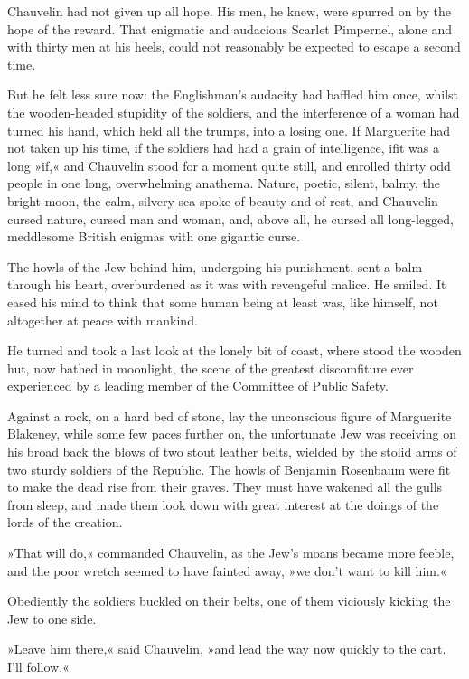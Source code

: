Chauvelin had not given up all hope. His men, he knew, were spurred on by the hope of the reward. That enigmatic and audacious Scarlet Pimpernel, alone and with thirty men at his heels, could not reasonably be expected to escape a second time.

But he felt less sure now: the Englishman's audacity had baffled him once, whilst the wooden-headed stupidity of the soldiers, and the interference of a woman had turned his hand, which held all the trumps, into a losing one. If Marguerite had not taken up his time, if the soldiers had had a grain of intelligence, if\textellipsis \allowbreak  it was a long »if,« and Chauvelin stood for a moment quite still, and enrolled thirty odd people in one long, overwhelming anathema. Nature, poetic, silent, balmy, the bright moon, the calm, silvery sea spoke of beauty and of rest, and Chauvelin cursed nature, cursed man and woman, and, above all, he cursed all long-legged, meddlesome British enigmas with one gigantic curse.

The howls of the Jew behind him, undergoing his punishment, sent a balm through his heart, overburdened as it was with revengeful malice. He smiled. It eased his mind to think that some human being at least was, like himself, not altogether at peace with mankind.

He turned and took a last look at the lonely bit of coast, where stood the wooden hut, now bathed in moonlight, the scene of the greatest discomfiture ever experienced by a leading member of the Committee of Public Safety.

Against a rock, on a hard bed of stone, lay the unconscious figure of Marguerite Blakeney, while some few paces further on, the unfortunate Jew was receiving on his broad back the blows of two stout leather belts, wielded by the stolid arms of two sturdy soldiers of the Republic. The howls of Benjamin Rosenbaum were fit to make the dead rise from their graves. They must have wakened all the gulls from sleep, and made them look down with great interest at the doings of the lords of the creation.

»That will do,« commanded Chauvelin, as the Jew's moans became more feeble, and the poor wretch seemed to have fainted away, »we don't want to kill him.«

Obediently the soldiers buckled on their belts, one of them viciously kicking the Jew to one side.

»Leave him there,« said Chauvelin, »and lead the way now quickly to the cart. I'll follow.«

